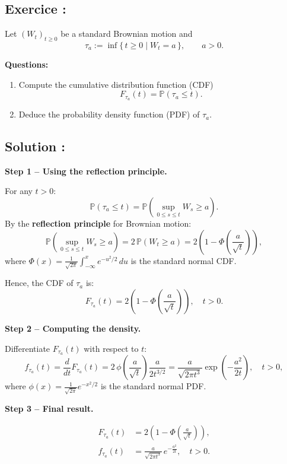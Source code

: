 \subsection*{Exercice :}

\begin{exerciseBox}
Let \( (W_t)_{t \ge 0} \) be a standard Brownian motion and
\[
\tau_a := \inf\{\, t \ge 0 \mid W_t = a \,\}, \qquad a > 0.
\]

\textbf{Questions:}
\begin{enumerate}
  \item Compute the cumulative distribution function (CDF)
  \[
  F_{\tau_a}(t) = \mathbb{P}(\tau_a \le t).
  \]
  \item Deduce the probability density function (PDF) of \( \tau_a \).
\end{enumerate}
\end{exerciseBox}

\subsection*{Solution :}

\textbf{Step 1 – Using the reflection principle.}

For any \( t > 0 \):
\[
\mathbb{P}(\tau_a \le t)
= \mathbb{P}\!\left(\sup_{0 \le s \le t} W_s \ge a\right).
\]
By the \textbf{reflection principle} for Brownian motion:
\[
\mathbb{P}\!\left(\sup_{0 \le s \le t} W_s \ge a\right)
= 2\,\mathbb{P}(W_t \ge a)
= 2\left(1 - \Phi\!\left(\frac{a}{\sqrt{t}}\right)\right),
\]
where \( \Phi(x) = \frac{1}{\sqrt{2\pi}} \int_{-\infty}^x e^{-u^2/2}\,du \)
is the standard normal CDF.

Hence, the CDF of \( \tau_a \) is:
\[
\boxed{
F_{\tau_a}(t)
= 2\left(1 - \Phi\!\left(\frac{a}{\sqrt{t}}\right)\right),
\quad t > 0.
}
\]


\textbf{Step 2 – Computing the density.}

Differentiate \( F_{\tau_a}(t) \) with respect to \(t\):
\[
f_{\tau_a}(t)
= \frac{d}{dt} F_{\tau_a}(t)
= 2\,\phi\!\left(\frac{a}{\sqrt{t}}\right)
   \frac{a}{2t^{3/2}}
= \frac{a}{\sqrt{2\pi t^3}} \exp\!\left(-\frac{a^2}{2t}\right),
\quad t > 0,
\]
where \( \phi(x) = \frac{1}{\sqrt{2\pi}}e^{-x^2/2} \) is the standard normal PDF.


\textbf{Step 3 – Final result.}

\[
\boxed{
\begin{aligned}
F_{\tau_a}(t) &= 2\!\left(1 - \Phi\!\left(\frac{a}{\sqrt{t}}\right)\right),
\\[4pt]
f_{\tau_a}(t) &= \frac{a}{\sqrt{2\pi t^3}}\,
                 e^{-\frac{a^2}{2t}}, \quad t>0.
\end{aligned}
}
\]

